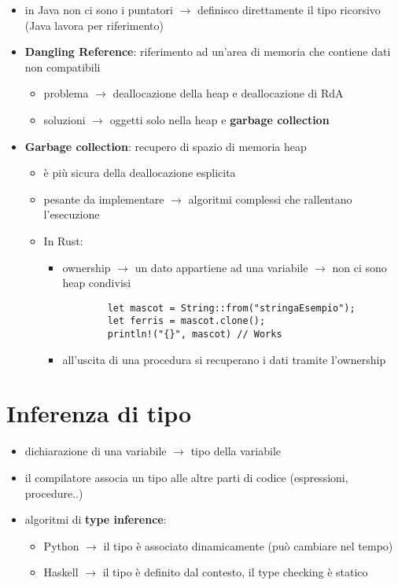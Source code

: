 \documentclass[12pt]{extarticle}
\begin{document}
\begin{flushleft}
\begin{itemize}
  \item in Java non ci sono i puntatori $\rightarrow$ definisco direttamente il tipo ricorsivo (Java lavora per riferimento)
  \item \textbf{Dangling Reference}: riferimento ad un'area di memoria che contiene dati non compatibili
  \begin{itemize}
    \item problema $\rightarrow$ deallocazione della heap e deallocazione di RdA
    \item soluzioni $\rightarrow$ oggetti solo nella heap e \textbf{garbage collection}
  \end{itemize}
  \item \textbf{Garbage collection}: recupero di spazio di memoria heap 
  \begin{itemize}
    \item è più sicura della deallocazione esplicita
    \item pesante da implementare $\rightarrow$ algoritmi complessi che rallentano l'esecuzione
    \item In Rust:
    \begin{itemize}
      \item ownership $\rightarrow$ un dato appartiene ad una variabile $\rightarrow$ non ci sono heap condivisi
      \begin{lstlisting}
        let mascot = String::from("stringaEsempio");
        let ferris = mascot.clone();
        println!("{}", mascot) // Works
      \end{lstlisting}
      \item all'uscita di una procedura si recuperano i dati tramite l'ownership
    \end{itemize}
  \end{itemize}
\end{itemize}

\medskip

\section*{Inferenza di tipo}
\begin{itemize}
  \item dichiarazione di una variabile $\rightarrow$ tipo della variabile
  \item il compilatore associa un tipo alle altre parti di codice (espressioni, procedure..)
  \item algoritmi di \textbf{type inference}:
  \begin{itemize}
    \item Python $\rightarrow$ il tipo è associato dinamicamente (può cambiare nel tempo)
    \item Haskell $\rightarrow$ il tipo è definito dal contesto, il type checking è statico
  \end{itemize}
\end{itemize}


\end{flushleft}
\end{document}
